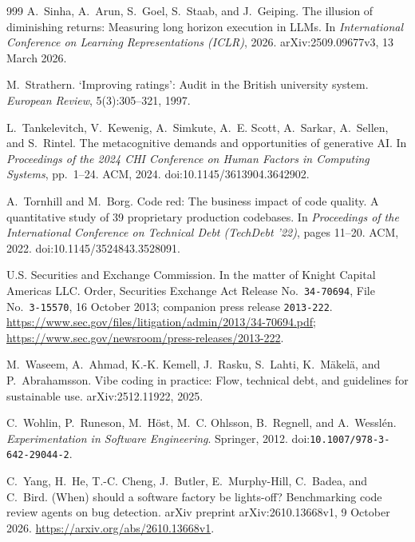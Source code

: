 \documentclass[11pt,a4paper]{article}
\begin{document}
\begin{thebibliography}{999}
A.~Sinha, A.~Arun, S.~Goel, S.~Staab, and J.~Geiping.
\newblock The illusion of diminishing returns: Measuring long horizon execution
in {LLMs}.
\newblock In \emph{International Conference on Learning Representations
(ICLR)}, 2026.
\newblock arXiv:2509.09677v3, 13 March 2026.

M.~Strathern.
\newblock \textquoteleft{}Improving ratings\textquoteright{}: Audit in the {British} university system.
\newblock \emph{European Review}, 5(3):305--321, 1997.

L.~Tankelevitch, V.~Kewenig, A.~Simkute, A.~E. Scott, A.~Sarkar, A.~Sellen,
and S.~Rintel.
\newblock The metacognitive demands and opportunities of generative {AI}.
\newblock In \emph{Proceedings of the 2024 CHI Conference on Human Factors in
Computing Systems}, pp.~1--24. ACM, 2024.
\newblock doi:10.1145/3613904.3642902.

A.~Tornhill and M.~Borg.
\newblock Code red: The business impact of code quality. {A} quantitative study
of 39 proprietary production codebases.
\newblock In \emph{Proceedings of the International Conference on Technical
Debt (TechDebt '22)}, pages 11--20. ACM, 2022.
\newblock doi:10.1145/3524843.3528091.

{U.S. Securities and Exchange Commission}.
\newblock In the matter of {Knight Capital Americas LLC}.
\newblock Order, Securities Exchange Act Release No.~\nolinkurl{34-70694}, File No.~\nolinkurl{3-15570},
16 October 2013; companion press release \nolinkurl{2013-222}.
\newblock \url{https://www.sec.gov/files/litigation/admin/2013/34-70694.pdf};
\url{https://www.sec.gov/newsroom/press-releases/2013-222}.

M.~Waseem, A.~Ahmad, K.-K. Kemell, J.~Rasku, S.~Lahti, K.~M\"akel\"a, and
P.~Abrahamsson.
\newblock Vibe coding in practice: Flow, technical debt, and guidelines for
sustainable use.
\newblock arXiv:2512.11922, 2025.

C.~Wohlin, P.~Runeson, M.~H\"ost, M.~C. Ohlsson, B.~Regnell, and
A.~Wessl\'en.
\newblock \emph{Experimentation in Software Engineering}.
\newblock Springer, 2012.
\newblock doi:\nolinkurl{10.1007/978-3-642-29044-2}.

C.~Yang, H.~He, T.-C. Cheng, J.~Butler, E.~Murphy-Hill, C.~Badea, and C.~Bird.
\newblock (When) should a software factory be lights-off? Benchmarking code
review agents on bug detection.
\newblock arXiv preprint arXiv:2610.13668v1, 9 October 2026.
\newblock \url{https://arxiv.org/abs/2610.13668v1}.


\end{thebibliography}
\end{document}
